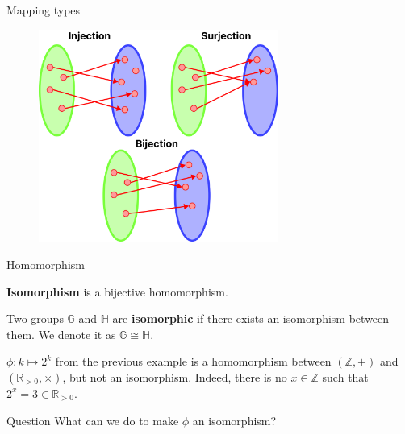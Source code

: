 \documentclass{beamer}
\begin{document}
  \begin{frame}{Mapping types}
    \begin{figure}
      \includegraphics[width=0.7\textwidth]{images/lecture_1/mapping.pdf}
      \label{fig:mappings}
    \end{figure}
  \end{frame}

  \begin{frame}{Homomorphism}
    \begin{definition}
      \textbf{Isomorphism} is a bijective homomorphism.
    \end{definition}

    \begin{definition}
      Two groups $\mathbb{G}$ and $\mathbb{H}$ are \textbf{isomorphic} if there exists an isomorphism between them. We denote it as $\mathbb{G} \cong \mathbb{H}$.
    \end{definition}

    \begin{example}
     $\phi: k \mapsto 2^k$ from the previous example is a homomorphism between $(\mathbb{Z},+)$ and $(\mathbb{R}_{>0},\times)$, but not an isomorphism. Indeed, there is no $x \in \mathbb{Z}$ such that $2^x = 3 \in \mathbb{R}_{>0}$.
    \end{example}

    \begin{alertblock}{Question}
      What can we do to make $\phi$ an isomorphism?
     \end{alertblock}
  \end{frame}
\end{document}
